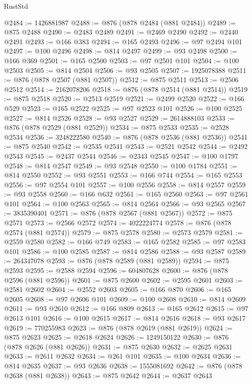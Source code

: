 \begin{lexlean}{RustStd}
\begin{coremodule}
@2484 := 1426881987
@2488 := @876 (@878 @2484 (@881 @2484))
@2489 := @875 @2488
@2490 := @2483 @2489
@2491 := @2469 @2490
@2492 := @2440 @2491
@2493 := @166 @383
@2494 := @165 @2493
@2496 := @97 @2494 @101
@2497 := @100 @2496
@2498 := @814 @2497
@2499 := @93 @2498
@2500 := @166 @369
@2501 := @165 @2500
@2503 := @97 @2501 @101
@2504 := @100 @2503
@2505 := @814 @2504
@2506 := @93 @2505
@2507 := 1925078388
@2511 := @876 (@878 @2507 (@881 @2507))
@2512 := @875 @2511
@2513 := @2506 @2512
@2514 := 2162078206
@2518 := @876 (@878 @2514 (@881 @2514))
@2519 := @875 @2518
@2520 := @2513 @2519
@2521 := @2499 @2520
@2522 := @166 @529
@2523 := @165 @2522
@2525 := @97 @2523 @101
@2526 := @100 @2525
@2527 := @814 @2526
@2528 := @93 @2527
@2529 := 2614888103
@2533 := @876 (@878 @2529 (@881 @2529))
@2534 := @875 @2533
@2535 := @2528 @2534
@2536 := 3248222580
@2540 := @876 (@878 @2536 (@881 @2536))
@2541 := @875 @2540
@2542 := @2535 @2541
@2543 := @2521 @2542
@2544 := @2492 @2543
@2545 := @2437 @2544
@2546 := @2343 @2545
@2547 := @100 @1797
@2548 := @814 @2547
@2549 := @93 @2548
@2550 := @100 @1784
@2551 := @814 @2550
@2552 := @93 @2551
@2553 := @166 @744
@2554 := @165 @2553
@2556 := @97 @2554 @101
@2557 := @100 @2556
@2558 := @814 @2557
@2559 := @93 @2558
@2560 := @166 @632
@2561 := @165 @2560
@2563 := @97 @2561 @101
@2564 := @100 @2563
@2565 := @814 @2564
@2566 := @93 @2565
@2567 := 3835390401
@2571 := @876 (@878 @2567 (@881 @2567))
@2572 := @875 @2571
@2573 := @2566 @2572
@2574 := 4022224774
@2578 := @876 (@878 @2574 (@881 @2574))
@2579 := @875 @2578
@2580 := @2573 @2579
@2581 := @2559 @2580
@2582 := @166 @749
@2583 := @165 @2582
@2585 := @97 @2583 @101
@2586 := @100 @2585
@2587 := @814 @2586
@2588 := @93 @2587
@2589 := 264347078
@2593 := @876 (@878 @2589 (@881 @2589))
@2594 := @875 @2593
@2595 := @2588 @2594
@2596 := 604807628
@2600 := @876 (@878 @2596 (@881 @2596))
@2601 := @875 @2600
@2602 := @2595 @2601
@2603 := @2581 @2602
@2604 := @2552 @2603
@2605 := @166 @870
@2606 := @165 @2605
@2608 := @97 @2606 @101
@2609 := @100 @2608
@2610 := @814 @2609
@2611 := @93 @2610
@2612 := @166 @809
@2613 := @165 @2612
@2615 := @97 @2613 @101
@2616 := @100 @2615
@2617 := @814 @2616
@2618 := @93 @2617
@2619 := 770255983
@2623 := @876 (@878 @2619 (@881 @2619))
@2624 := @875 @2623
@2625 := @2618 @2624
@2626 := 1249150122
@2630 := @876 (@878 @2626 (@881 @2626))
@2631 := @875 @2630
@2632 := @2625 @2631
@2633 := @2611 @2632
@2634 := @261 @101
@2635 := @100 @2634
@2636 := @814 @2635
@2637 := @93 @2636
@2638 := 1555081692
@2642 := @876 (@878 @2638 (@881 @2638))
@2643 := @875 @2642
@2644 := @2637 @2643

\end{coremodule}
\end{lexlean}
